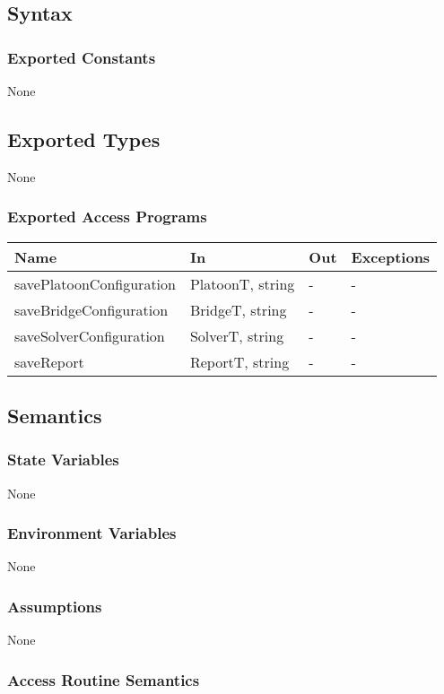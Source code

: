 \documentclass[12pt, titlepage]{article}
\begin{document}
\subsection{Syntax}

\subsubsection{Exported Constants}
None
\subsection{Exported Types}
None
\subsubsection{Exported Access Programs}
\begin{center}
\begin{tabular}{p{5cm} p{5cm} p{2cm} p{2cm}}
\hline
\textbf{Name} & \textbf{In} & \textbf{Out} & \textbf{Exceptions} \\
\hline
savePlatoonConfiguration & PlatoonT, string & - & - \\
\hline
saveBridgeConfiguration & BridgeT, string & - & - \\
\hline
saveSolverConfiguration & SolverT, string & - & - \\
\hline
saveReport & ReportT, string & - & - \\
\hline
\end{tabular}
\end{center}

\subsection{Semantics}

\subsubsection{State Variables}
None
\subsubsection{Environment Variables}
None
\subsubsection{Assumptions}
None
\subsubsection{Access Routine Semantics}
\end{document}
